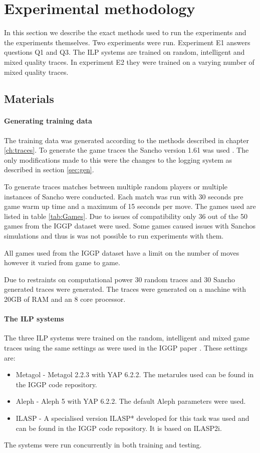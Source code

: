 \chapter{Experimental methodology}\label{ch:methodology}

In this section we describe the exact methods used to run the experiments and the experiments themselves. Two experiments were run. Experiment E1 answers questions Q1 and Q3. The ILP systems are trained on random, intelligent and mixed quality traces. In experiment E2 they were trained on a varying number of mixed quality traces. 

\section{Materials}
\subsubsection{Generating training data}
The training data was generated according to the methods described in chapter \ref{ch:traces}. To generate the game traces the Sancho version 1.61 was used \cite{Sancho/Github}. The only modifications made to this were the changes to the logging system as described in section \ref{sec:gen}.

To generate traces matches between multiple random players or multiple instances of Sancho were conducted. Each match was run with 30 seconds pre game warm up time and a maximum of 15 seconds per move. The games used are listed in table \ref{tab:Games}. Due to issues of compatibility only 36 out of the 50 games from the IGGP dataset were used. Some games caused issues with Sanchos simulations and thus is was not possible to run experiments with them. 

All games used from the IGGP dataset have a limit on the number of moves however it varied from game to game.

Due to restraints on computational power 30 random traces and 30 Sancho generated traces were generated. The traces were generated on a machine with 20GB of RAM and an 8 core processor. 

\subsubsection{The ILP systems}

The three ILP systems were trained on the random, intelligent and mixed game traces using the same settings as were used in the IGGP paper \cite{Cropper/IGGP}. These settings are:
\begin{itemize}
	\item Metagol - Metagol 2.2.3 with YAP 6.2.2. The metarules used can be found in the IGGP code repository.
	\item Aleph - Aleph 5 with YAP 6.2.2. The default Aleph parameters were used.
	\item ILASP - A specialised version ILASP* developed for this task was used and can be found in the IGGP code repository. It is based on ILASP2i.
\end{itemize}
The systems were run concurrently in both training and testing.


